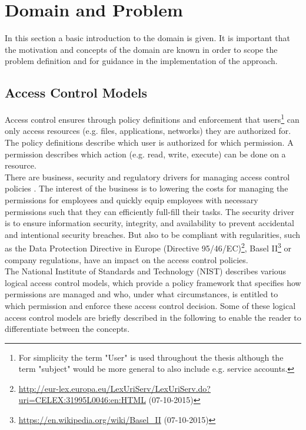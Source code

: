 \newpage
\chapter{Domain and Problem}
\label{sec:domain}
In this section a basic introduction to the domain is given. It is important that the motivation and concepts of the domain are known in order to scope the problem definition and for guidance in the implementation of the approach.

    \section{Access Control Models}
    Access control ensures through policy definitions and enforcement that users\footnote{For simplicity the term "User" is used throughout the thesis although the term "subject" would be more general to also include e.g. service accounts.} can only access resources (e.g. files, applications, networks) they are authorized for. The policy definitions describe which user is authorized for which permission. A permission describes which action (e.g. read, write, execute) can be done on a resource.\\
    There are business, security and regulatory drivers for managing access control policies \cite{o20102010}. The interest of the business is to lowering the costs for managing the permissions for employees and quickly equip employees with necessary permissions such that they can efficiently full-fill their tasks. The security driver is to ensure information security, integrity, and availability to prevent accidental and intentional security breaches. But also to be compliant with regularities, such as the Data Protection Directive in Europe (Directive 95/46/EC)\footnote{\url{http://eur-lex.europa.eu/LexUriServ/LexUriServ.do?uri=CELEX:31995L0046:en:HTML} (07-10-2015)}, Basel II\footnote{\url{https://en.wikipedia.org/wiki/Basel_II} (07-10-2015)} or company regulations, have an impact on the access control policies.\\
    The National Institute of Standards and Technology (NIST) \cite{Hu13guideto} describes various logical access control models, which provide a policy framework that specifies how permissions are managed and who, under what circumstances, is entitled to which permission and enforce these access control decision. Some of these logical access control models are briefly described in the following to enable the reader to differentiate between the concepts.
    \iffalse There is no consensus on the terms access control models, mechanisms and techniques. In this thesis an access control policy model describes a policy framework that specifies how permissions are managed and who, under what circumstances, is entitled to which permission on a high-level. There are different Access Control Policy Models which come with different advantages and disadvantages. Some of these models are briefly described in the following to enable the reader to differentiate between the concepts. \fi
